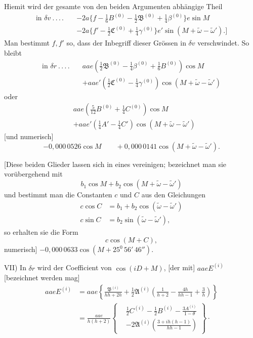 Hiemit wird der gesamte von den beiden Argumenten abhängige Theil
\[
\begin{aligned}
\text{in }\delta v\ .\, .\, .\, .\quad&-2a\{f-\tfrac16B^{(0)}-\tfrac12\mathfrak B^{(0)}+\tfrac14\beta^{(0)}\}e\sin M\\
&-2a\{f'-\tfrac12\mathfrak C^{(0)}+\tfrac14\gamma^{(0)}\}e'\sin(M+\tilde\omega-\tilde\omega').]
\end{aligned}
\]
Man bestimmt \(f,f'\) so, dass der Inbegriff dieser Grössen in \(\delta v\) verschwindet. So bleibt
\[
\begin{aligned}
\text{in }\delta r\ .\, .\, .\, .\quad&aae(\tfrac12\mathfrak B^{(0)}-\tfrac14\beta^{(0)}+\tfrac16B^{(0)})\cos M\\
&+aae'(\tfrac12\mathfrak C^{(0)}-\tfrac14\gamma^{(0)})\cos(M+\tilde\omega-\tilde\omega')
\end{aligned}
\]
oder
\[
\begin{aligned}
&aae(\tfrac5{12}B^{(0)}+\tfrac14C^{(0)})\cos M\\
&+aae'(\tfrac14A'-\tfrac14C')\cos(M+\tilde\omega-\tilde\omega')
\end{aligned}
\]
[und numerisch]
\[
-0{,}000\,0526\cos M\qquad+0{,}000\,0141\cos(M+\tilde\omega-\tilde\omega').
\]

[Diese beiden Glieder lassen sich in eines vereinigen; bezeichnet man sie vorübergehend mit
\[
b_1\cos M+b_2\cos(M+\tilde\omega-\tilde\omega')
\]
und bestimmt man die Constanten \(c\) und \(C\) aus den Gleichungen
\[
\begin{aligned}
c\cos C&=b_1+b_2\cos(\tilde\omega-\tilde\omega')\\
c\sin C&=b_2\sin(\tilde\omega-\tilde\omega'),
\end{aligned}
\]
so erhalten sie die Form
\[
c\cos(M+C),
\]
numerisch] \(-0{,}000\,0633\cos(M+25^{0}\,56'\,46'').\)

VII) In \(\delta r\) wird der Coefficient von \(\cos(iD+M)\), [der mit] \(aaeE^{(i)}\) [bezeichnet werden mag]
\[
\begin{aligned}
aaeE^{(i)}&=aae\left\{\frac{\mathfrak B^{(i)}}{hh+2h}+\tfrac12\mathfrak A^{(i)}\left(\frac1{h+2}-\frac{4h}{hh-1}+\frac3h\right)\right\}\\
&=\frac{aae}{h(h+2)}\left\{\begin{aligned}
&\tfrac12C^{(i)}-\tfrac12B^{(i)}-\frac{3A^{(i)}}{1-\theta}\\
&-2\mathfrak A^{(i)}\left(\frac{3+ih(h-1)}{hh-1}\right)
\end{aligned}\right\}\mathpunct{\cdot}
\end{aligned}
\]

